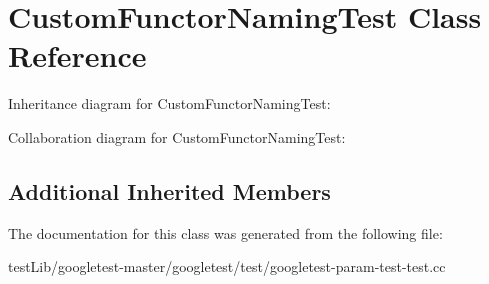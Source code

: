\hypertarget{classCustomFunctorNamingTest}{}\section{Custom\+Functor\+Naming\+Test Class Reference}
\label{classCustomFunctorNamingTest}


Inheritance diagram for Custom\+Functor\+Naming\+Test\+:


Collaboration diagram for Custom\+Functor\+Naming\+Test\+:
\subsection*{Additional Inherited Members}


The documentation for this class was generated from the following file\+:\begin{DoxyCompactItemize}
\item 
test\+Lib/googletest-\/master/googletest/test/googletest-\/param-\/test-\/test.\+cc\end{DoxyCompactItemize}
